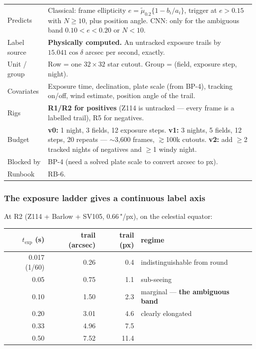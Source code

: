 \documentclass[11pt]{article}
\begin{document}
\begin{center}
\small
\begin{tabular}{@{}p{}p{}@{}}
\toprule
Predicts & Classical: frame ellipticity $e = \tilde\mu_{0.2}\{1 - b_i/a_i\}$, trigger at $e > 0.15$ with $N \geq 10$, plus position angle. CNN: only for the ambiguous band $0.10 < e < 0.20$ or $N < 10$. \\
Label source & \textbf{Physically computed.} An untracked exposure trails by $15.041\cos\delta$ arcsec per second, exactly. \\
Unit / group & Row = one $32\times32$ star cutout. Group = (field, exposure step, night). \\
Covariates & Exposure time, declination, plate scale (from BP-4), tracking on/off, wind estimate, position angle of the trail. \\
Rigs & \textbf{R1/R2 for positives} (Z114 is untracked --- every frame is a labelled trail), R5 for negatives. \\
Budget & \textbf{v0:} 1 night, 3 fields, 12 exposure steps. \textbf{v1:} 3 nights, 5 fields, 12 steps, 20 repeats --- $\sim$3,600 frames, $\gtrsim$100k cutouts. \textbf{v2:} add $\geq$2 tracked nights of negatives and $\geq$1 windy night. \\
Blocked by & BP-4 (need a solved plate scale to convert arcsec to px). \\
Runbook & RB-6. \\
\bottomrule
\end{tabular}
\end{center}

\subsubsection*{The exposure ladder gives a continuous label axis}

At R2 (Z114 + Barlow + SV105, 0.66\,"/px), on the celestial equator:

\begin{center}
\small
\begin{tabular}{@{}rrrl@{}}
\toprule
$t_{\mathrm{exp}}$ (s) & trail (arcsec) & trail (px) & regime \\
\midrule
0.017 (1/60) & 0.26 & 0.4 & indistinguishable from round \\
0.05  & 0.75 & 1.1 & sub-seeing \\
0.10  & 1.50 & 2.3 & marginal --- \textbf{the ambiguous band} \\
0.20  & 3.01 & 4.6 & clearly elongated \\
0.33  & 4.96 & 7.5 & \\
0.50  & 7.52 & 11.4 & \\
\bottomrule
\end{tabular}
\end{center}
\end{document}

